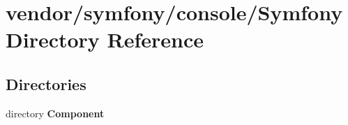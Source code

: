 \section{vendor/symfony/console/\+Symfony Directory Reference}
\label{dir_faba0ebad3ffbc69cc5c0d10475e6654}
\subsection*{Directories}
\begin{DoxyCompactItemize}
\item 
directory {\bf Component}
\end{DoxyCompactItemize}
